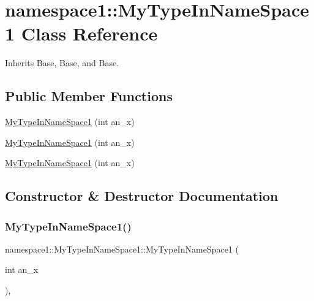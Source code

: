 \hypertarget{classnamespace1_1_1_my_type_in_name_space1}{}\section{namespace1\+::My\+Type\+In\+Name\+Space1 Class Reference}
\label{classnamespace1_1_1_my_type_in_name_space1}


Inherits Base, Base, and Base.

\subsection*{Public Member Functions}
\begin{DoxyCompactItemize}
\item 
\mbox{\hyperlink{classnamespace1_1_1_my_type_in_name_space1_a2e4277aa118e9b83045a18392188a0d8}{My\+Type\+In\+Name\+Space1}} (int an\+\_\+x)
\item 
\mbox{\hyperlink{classnamespace1_1_1_my_type_in_name_space1_a2e4277aa118e9b83045a18392188a0d8}{My\+Type\+In\+Name\+Space1}} (int an\+\_\+x)
\item 
\mbox{\hyperlink{classnamespace1_1_1_my_type_in_name_space1_a2e4277aa118e9b83045a18392188a0d8}{My\+Type\+In\+Name\+Space1}} (int an\+\_\+x)
\end{DoxyCompactItemize}


\subsection{Constructor \& Destructor Documentation}
\mbox{\label{classnamespace1_1_1_my_type_in_name_space1_a2e4277aa118e9b83045a18392188a0d8}} 
\subsubsection{\texorpdfstring{MyTypeInNameSpace1()}{MyTypeInNameSpace1()}\hspace{0.1cm}{\footnotesize\ttfamily [1/3]}}
{\footnotesize\ttfamily namespace1\+::\+My\+Type\+In\+Name\+Space1\+::\+My\+Type\+In\+Name\+Space1 (\begin{DoxyParamCaption}\item[{int}]{an\+\_\+x }\end{DoxyParamCaption})\hspace{0.3cm}{\ttfamily [inline]}, {\ttfamily [explicit]}}

